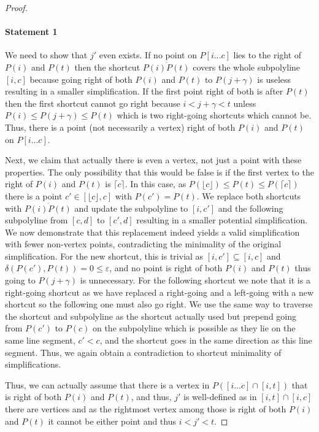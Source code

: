 \begin{proof}
	\paragraph{Statement 1} We need to show that \(j'\) even exists. If no point on \(P[i \dots c]\) lies to the right of \(P(i)\) and \(P(t)\) then the shortcut \(\overline{P(i)P(t)}\) covers the whole subpolyline \([i, c]\) because going right of both \(P(i)\) and \(P(t)\) to \(P(j + \gamma)\) is useless resulting in a smaller simplification. If the first point right of both is after \(P(t)\) then the first shortcut cannot go right because \(i < j + \gamma < t\) unless \(P(i) \leq P(j+\gamma) \leq P(t)\) which is two right-going shortcuts which cannot be. Thus, there is a point (not necessarily a vertex) right of both \(P(i)\) and \(P(t)\) on \(P[i \dots c]\). 

	Next, we claim that actually there is even a vertex, not just a point with these properties. The only possibility that this would be false is if the first vertex to the right of \(P(i)\) and \(P(t)\) is \(\lceil{c}\rceil\). In this case, as \(P(\lfloor{c}\rfloor) \leq P(t) \leq P(\lceil{c}\rceil)\) there is a point \(c' \in [\lfloor{c}\rfloor, c]\) with \(P(c') = P(t)\). We replace both shortcuts with \(\overline{P(i)P(t)}\) and update the subpolyline to \([i, c']\) and the following subpolyline from \([c, d]\) to \([c', d]\) resulting in a smaller potential simplification. We now demonstrate that this replacement indeed yields a valid simplification with fewer non-vertex points, contradicting the minimality of the original simplification. For the new shortcut, this is trivial as \([i, c'] \subseteq [i, c]\) and \(\delta(P(c'), P(t)) = 0 \leq \varepsilon\), and no point is right of both \(P(i)\) and \(P(t)\) thus going to \(P(j+\gamma)\) is unnecessary. For the following shortcut we note that it is a right-going shortcut as we have replaced a right-going and a left-going with a new shortcut so the following one must also go right. We use the same way to traverse the shortcut and subpolyline as the shortcut actually used but prepend going from \(P(c')\) to \(P(c)\) on the subpolyline which is possible as they lie on the same line segment, \(c' < c\), and the shortcut goes in the same direction as this line segment. Thus, we again obtain a contradiction to shortcut minimality of simplifications.

	Thus, we can actually assume that there is a vertex in \(P([i \dots c] \cap [i, t])\) that is right of both \(P(i)\) and \(P(t)\), and thus, \(j'\) is well-defined as in \([i, t] \cap [i, c]\) there are vertices and as the rightmost vertex among those is right of both \(P(i)\) and \(P(t)\) it cannot be either point and thus \(i < j' < t\).



\end{proof}
